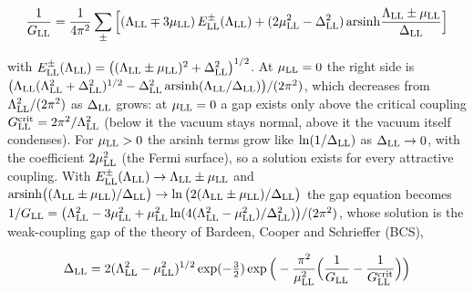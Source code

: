 \documentclass[
  10pt,
]{article}
\begin{document}
\[\frac1{G_{\rm LL}}=\frac1{4\pi^2}\sum_{\pm}\Big[(\Lambda_{\rm LL}\mp3\mu_{\rm LL})\,E^\pm_{\rm LL}(\Lambda_{\rm LL})+(2\mu_{\rm LL}^2-\Delta_{\rm LL}^2)\,\mathrm{arsinh}\frac{\Lambda_{\rm LL}\pm\mu_{\rm LL}}{\Delta_{\rm LL}}\Big]\]

with
\(E^\pm_{\rm LL}(\Lambda_{\rm LL})=\big((\Lambda_{\rm LL}\pm\mu_{\rm LL})^2+\Delta_{\rm LL}^2\big)^{1/2}\).
At \(\mu_{\rm LL}=0\) the right side is
\(\big(\Lambda_{\rm LL}(\Lambda_{\rm LL}^2+\Delta_{\rm LL}^2)^{1/2}-\Delta_{\rm LL}^2\,\mathrm{arsinh}(\Lambda_{\rm LL}/\Delta_{\rm LL})\big)/(2\pi^2)\),
which decreases from \(\Lambda_{\rm LL}^2/(2\pi^2)\) as
\(\Delta_{\rm LL}\) grows: at \(\mu_{\rm LL}=0\) a gap exists only above
the critical coupling
\(G^{\rm crit}_{\rm LL}=2\pi^2/\Lambda_{\rm LL}^2\) (below it the vacuum
stays normal, above it the vacuum itself condenses). For
\(\mu_{\rm LL}>0\) the arsinh terms grow like \(\ln(1/\Delta_{\rm LL})\)
as \(\Delta_{\rm LL}\to0\), with the coefficient \(2\mu_{\rm LL}^2\)
(the Fermi surface), so a solution exists for every attractive coupling.
With
\(E^\pm_{\rm LL}(\Lambda_{\rm LL})\to\Lambda_{\rm LL}\pm\mu_{\rm LL}\)
and
\(\mathrm{arsinh}\big((\Lambda_{\rm LL}\pm\mu_{\rm LL})/\Delta_{\rm LL}\big)\to\ln\big(2(\Lambda_{\rm LL}\pm\mu_{\rm LL})/\Delta_{\rm LL}\big)\)
the gap equation becomes
\(1/G_{\rm LL}=\big(\Lambda_{\rm LL}^2-3\mu_{\rm LL}^2+\mu_{\rm LL}^2\ln(4(\Lambda_{\rm LL}^2-\mu_{\rm LL}^2)/\Delta_{\rm LL}^2)\big)/(2\pi^2)\),
whose solution is the weak-coupling gap of the theory of Bardeen, Cooper
and Schrieffer (BCS),

\[\Delta_{\rm LL}=2(\Lambda_{\rm LL}^2-\mu_{\rm LL}^2)^{1/2}\exp(-\tfrac32)\exp\Big(-\frac{\pi^2}{\mu_{\rm LL}^2}\Big(\frac1{G_{\rm LL}}-\frac1{G^{\rm crit}_{\rm LL}}\Big)\Big)\]
\end{document}
